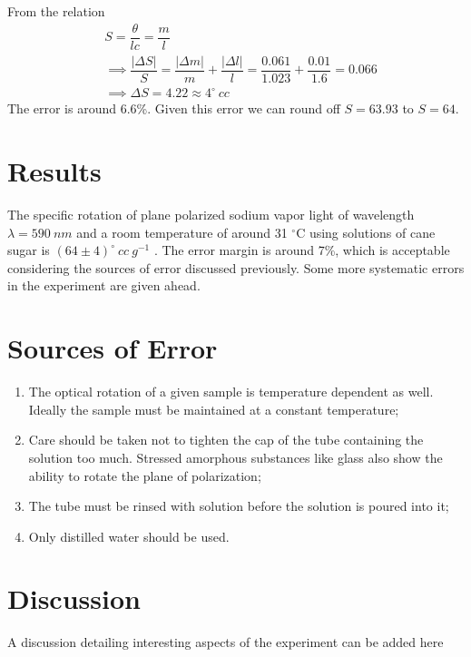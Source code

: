 \documentclass{dkpinto-report}
\begin{document}
From the relation
\begin{align*}
& S = \dfrac{\theta}{lc} = \dfrac{m}{l} \\
&\implies \dfrac{|\Delta S|}{S}  = \dfrac{|\Delta m|}{m} + \dfrac{|\Delta l| }{l} = \dfrac{0.061}{1.023} + \dfrac{0.01}{1.6} = 0.066\\
&\implies \Delta S =  4.22 \approx 4^{\circ}\ cc
\end{align*}
The error is around 6.6\%. Given this error we can round off $S = 63.93$ to $S = 64$.

\section{Results}
The specific rotation of plane polarized sodium vapor light of wavelength $\lambda = 590\ nm$ and a room temperature of  around 31 $^{\circ}$C using solutions of cane sugar is $(64 \pm 4) ^{\circ}\ cc\ g^{-1}$ . The error margin is around 7\%, which is acceptable considering the sources of error discussed previously. Some more systematic errors in the experiment are given ahead.

 
\section{Sources of Error}
\begin{enumerate}
\item The optical rotation of a given sample is temperature dependent as well. Ideally the sample must be maintained at a constant temperature;
\item Care should be taken not to tighten the cap of the tube containing the solution too much.  Stressed amorphous substances like glass also show the ability to rotate the plane of polarization;
\item The tube must be rinsed with solution before the solution is poured into it;
\item Only distilled water should be used.
\end{enumerate}

\section{Discussion}
A discussion detailing interesting aspects of the experiment can be added here


\end{document}
